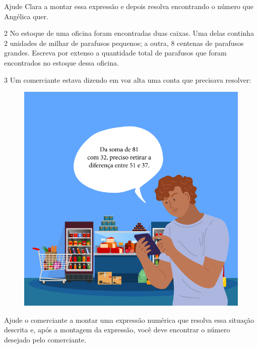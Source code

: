 Ajude Clara a montar essa expressão e depois resolva encontrando o
número que Angélica quer.

\begin{emptybox}
\bigskip
\bigskip
\bigskip
\bigskip
\end{emptybox}

\num{2} No estoque de uma oficina foram encontradas duas caixas.
Uma delas continha 2 unidades de milhar de parafusos pequenos; a outra, 8
centenas de parafusos grandes. Escreva por extenso a quantidade total de
parafusos que foram encontrados no estoque dessa oficina.

\begin{emptybox}
\bigskip
\bigskip
\bigskip
\bigskip
\end{emptybox}

\pagebreak
\num{3} Um comerciante estava dizendo em voz alta uma conta que precisava
resolver:

\begin{figure}[htpb!]
\centering
\includegraphics[width=\textwidth]{../ilustracoes/MAT5/SAEB_5ANO_MAT_figura91.png}
\end{figure}

Ajude o comerciante a montar uma expressão numérica que resolva
essa situação descrita e, após a montagem da expressão, você deve
encontrar o número desejado pelo comerciante.

